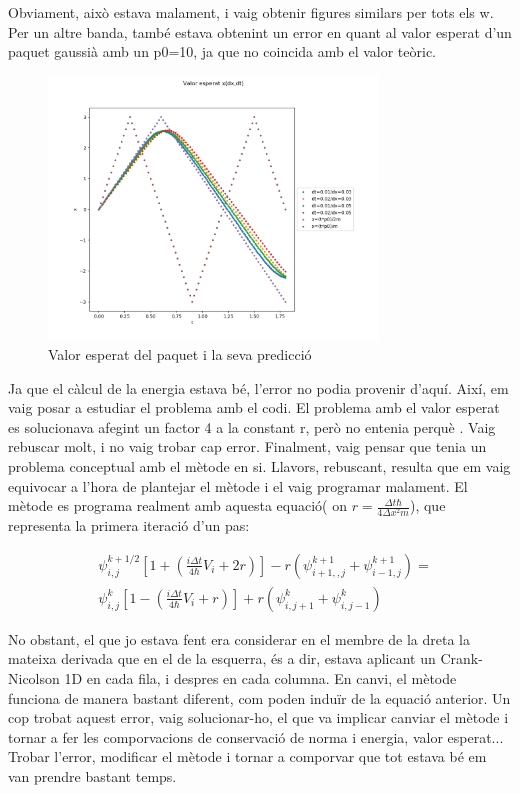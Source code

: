 \documentclass{article}
\begin{document}
Obviament, això estava malament, i vaig obtenir figures similars per tots els w. Per un altre banda, també estava obtenint un error en quant al valor esperat d'un paquet gaussià amb un p0=10, ja que no coincida amb el valor teòric. 

\begin{figure}[H]
	\includegraphics[width=\textwidth,height=7cm]{xespxmalament.png}
	\caption{Valor esperat del paquet i la seva predicció}
\end{figure}

Ja que el càlcul de la energia estava bé, l'error no podia provenir d'aquí. Així, em vaig posar a estudiar el problema amb el codi. El problema amb el valor esperat es solucionava afegint un factor 4 a la constant r, però no entenia perquè . Vaig rebuscar molt, i no vaig trobar cap error. Finalment, vaig pensar que tenia un problema conceptual amb el mètode en si. Llavors, rebuscant, resulta que em vaig equivocar a l'hora de plantejar el mètode i el vaig programar malament. El mètode es programa realment amb aquesta equació( on \(r=\frac{\Delta t \hbar}{4\Delta x^2 m}\)), que representa la primera iteració d'un pas:

\begin{align}
&\psi_{i,j}^{k+1/2}[1+(\frac{i\Delta t}{4\hbar}V_i+2r)]-r(\psi_{i+1,,j}^{k+1}+\psi_{i-1,j}^{k+1}) = \\
&\psi_{i,j}^{k}[1-(\frac{i\Delta t}{4\hbar}V_i+r)]+r(\psi_{i,j+1}^{k}+\psi_{i,j-1}^{k})
\end{align}

No obstant, el que jo estava fent era considerar en el membre de la dreta la mateixa derivada que en el de la esquerra, és a dir, estava aplicant un Crank-Nicolson 1D en cada fila, i despres en cada columna. En canvi, el mètode funciona de manera bastant diferent, com poden induïr de la equació anterior. Un cop trobat aquest error, vaig solucionar-ho, el que va implicar canviar el mètode i tornar a fer les comporvacions de conservació de norma i energia, valor esperat... Trobar l'error, modificar el mètode i tornar a comporvar que tot estava bé em van prendre bastant temps.
\end{document}
